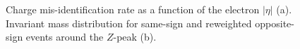 \begin{figure}[t]
\centering
{}
\caption{Charge mis-identification rate as a function of the electron $|\eta|$ (a).
    Invariant mass distribution for same-sign and reweighted opposite-sign events around the $Z$-peak (b).}
\end{figure}

